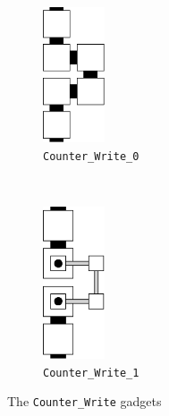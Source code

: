 \begin{figure}[H]
    \centering
    \begin{subfigure}[t]{0.2\textwidth}
        \centering
        \includegraphics[width=0.2\textwidth]{counter_write_0}
        \caption{\label{fig:counter_write_0} {\tt Counter\_Write\_0}}
    \end{subfigure}%
    ~
    \begin{subfigure}[t]{0.2\textwidth}
        \centering
        \includegraphics[width=0.2\textwidth]{counter_write_1}
        \caption{\label{fig:counter_write_1} {\tt Counter\_Write\_1}}
    \end{subfigure}%
    \caption{\label{fig:counter_write} The {\tt Counter\_Write} gadgets}
\end{figure}